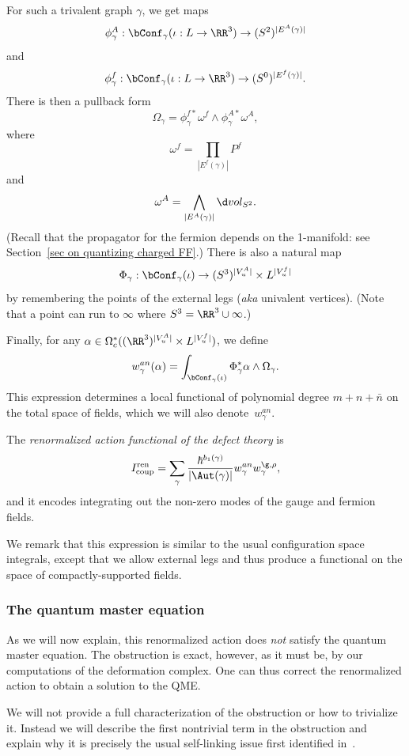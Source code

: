 \documentclass[10pt]{amsart}
\begin{document}
For such a trivalent graph $\gamma$, 
we get maps
\[
\phi^A_\gamma: \bConf_{\gamma}(\iota: L \to \RR^3) \to (S^2)^{|E^A(\gamma)|}
\]
and
\[
\phi^f_\gamma: \bConf_{\gamma}(\iota: L \to \RR^3) \to (S^0)^{|E^f(\gamma)|}.
\]
There is then a pullback form 
\[
\Omega_\gamma = \phi^{f*}_\gamma \omega^f \wedge \phi^{A*}_\gamma \omega^A,
\]
where
\[
\omega^f = \prod_{|E^f(\gamma)|} P^f
\]
and 
\[
\omega^A = \bigwedge_{|E^A(\gamma)|} \d vol_{S^2}.
\]
(Recall that the propagator for the fermion depends on the 1-manifold: see Section~\ref{sec on quantizing charged FF}.)
There is also a natural map 
\[
\Phi_\gamma: \bConf_\gamma(\iota) \to (S^3)^{|V_u^A|} \times  L^{|V_u^f|}
\]
by remembering the points of the external legs ({\em aka} univalent vertices).
(Note that a point can run to $\infty$ where $S^3 = \RR^3\cup\infty$.)

Finally, for any $\alpha \in \Omega^*_c((\RR^3)^{|V_u^A|} \times  L^{|V_u^f|})$, 
we define
\[
w^{an}_\gamma(\alpha) 
= \int_{\bConf_{\gamma}(\iota)} \Phi_\gamma^*\alpha \wedge \Omega_\gamma.
\]
This expression determines a local functional of polynomial degree $m + n + \bar{n}$ on the total space of fields,
which we will also denote~$w^{an}_\gamma$.

\begin{dfn}
\label{dfn: ren defect action}
The {\em renormalized action functional of the defect theory} is
\[
I_{\rm coup}^{\rm ren} = \sum_{\gamma} \frac{\hbar^{b_1(\gamma)}}{|\Aut(\gamma)|} w_\gamma^{an} w_\gamma^{\g,\rho},
\]
and it encodes integrating out the non-zero modes of the gauge and fermion fields.
\end{dfn}

We remark that this expression is similar to the usual configuration space integrals,
except that we allow external legs and 
thus produce a functional on the space of compactly-supported fields.

\subsubsection{The quantum master equation}

As we will now explain,
this renormalized action does {\em not} satisfy the quantum master equation.
The obstruction is exact, however, 
as it must be, by our computations of the deformation complex.
One can thus correct the renormalized action to obtain a solution to the QME.

We will not provide a full characterization of the obstruction or how to trivialize it.
Instead we will describe the first nontrivial term in the obstruction and explain why it is precisely the usual self-linking issue first identified in~\cite{BotTau}.
\end{document}
